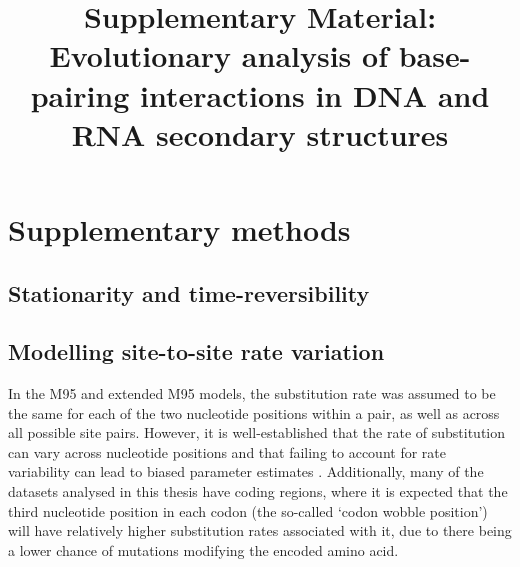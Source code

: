 \documentclass[]{article}
\title{Supplementary Material:\\Evolutionary analysis of base-pairing interactions in DNA and RNA secondary structures}
\date{}
\begin{document}
	
\let\oldthetable\thetable
\renewcommand{\thetable}{S\oldthetable}

\let\oldthefigure\thefigure
\renewcommand{\thefigure}{S\oldthefigure}

\let\oldthealgorithm\thealgorithm
\renewcommand{\thealgorithm}{S\oldthealgorithm}



\maketitle

\section{Supplementary methods}

\subsection{Stationarity and time-reversibility}
%

\subsection{Modelling site-to-site rate variation}\label{sec:sitetositevariation}
In the M95 and extended M95 models, the substitution rate was assumed to be the same for each of the two nucleotide positions within a pair, as well as across all possible site pairs. However, it is well-established that the rate of substitution can vary across nucleotide positions and that failing to account for rate variability can lead to biased parameter estimates \citep{yang1996among}. Additionally, many of the datasets analysed in this thesis have coding regions, where it is expected that the third nucleotide position in each codon (the so-called `codon wobble position') will have relatively higher substitution rates associated with it, due to there being a lower chance of mutations modifying the encoded amino acid.
\end{document}
